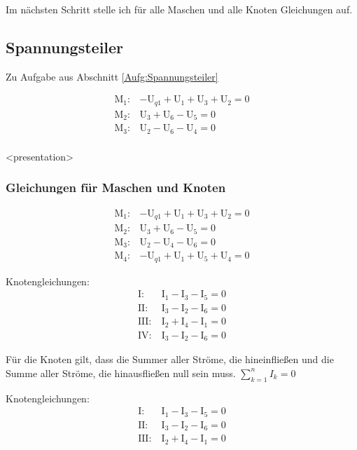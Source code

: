 Im nächsten Schritt stelle ich für alle Maschen und alle Knoten Gleichungen auf.

    \subsection{Spannungsteiler}
    Zu Aufgabe aus Abschnitt \ref{Aufg:Spannungsteiler}

\begin{align}
  \text{M}_1: & -\text{U}_{q1} + \text{U}_1 + \text{U}_3 + \text{U}_2 = 0\\
\text{M}_2: & \text{U}_3 + \text{U}_6 - \text{U}_5 = 0 \\
\text{M}_3: & \text{U}_2 - \text{U}_6 - \text{U}_4 = 0\\
\end{align}

\begin{frame}<presentation>
  \frametitle{Gleichungen für Maschen und Knoten}

\begin{align}
  \text{M}_1: & -\text{U}_{q1} + \text{U}_1 + \text{U}_3 + \text{U}_2 = 0\\
  \text{M}_2: & \text{U}_3 + \text{U}_6 - \text{U}_5 = 0 \\
  \text{M}_3: & \text{U}_2 - \text{U}_4 - \text{U}_6 = 0\\
  \text{M}_4: & -\text{U}_{q1} + \text{U}_1 + \text{U}_5 +\text{U}_4 = 0
\end{align}

Knotengleichungen:\\
\begin{align}
  \text{I:}\ & \text{I}_1 - \text{I}_3 - \text{I}_5 = 0\\
  \text{II:}\ & \text{I}_3 - \text{I}_2 - \text{I}_6 = 0\\
  \text{III:}\ & \text{I}_2 + \text{I}_4 -\text{I}_1 = 0\\
  \text{IV:}\ & \text{I}_3 - \text{I}_2 -\text{I}_6 = 0
\end{align}
\end{frame}

Für die Knoten gilt, dass die Summer aller Ströme, die hineinfließen und die Summe aller Ströme, die hinausfließen null sein muss. $\sum_{k=1}^n I_k = 0$

Knotengleichungen:\\
\begin{align}
  \text{I:}\ & \text{I}_1 - \text{I}_3 - \text{I}_5 = 0\\
  \text{II:}\ & \text{I}_3 - \text{I}_2 - \text{I}_6 = 0\\
  \text{III:}\ & \text{I}_2 + \text{I}_4 -\text{I}_1 = 0
\end{align}

